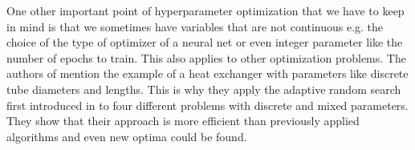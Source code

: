 One other important point of hyperparameter optimization that we have to keep in mind is that we sometimes have variables that are not continuous e.g. the choice of the type of optimizer of a neural net or even integer parameter like the number of epochs to train. This also applies to other optimization problems. The authors of  \cite{kelahan1978application} mention the example of a heat exchanger with parameters like discrete tube diameters and lengths. This is why they apply the adaptive random search first introduced in \cite{gall1966practical} to four different problems with discrete and mixed parameters. They show that their approach is more efficient than previously applied algorithms and even new optima could be found.








